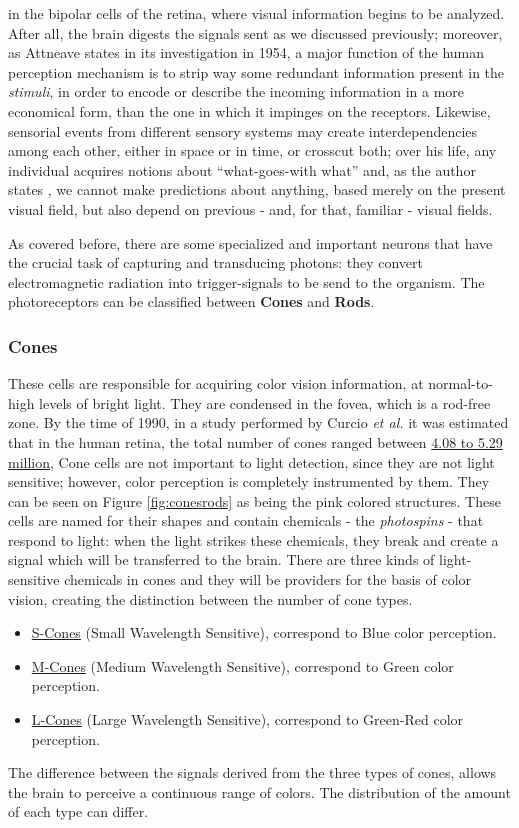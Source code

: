 \documentclass{report}
\begin{document}
in the bipolar cells of the retina, where visual information begins to be analyzed. After all, the brain digests the signals sent as we discussed
previously; moreover, as Attneave \cite{Attneave1954} states in its investigation in 1954, a major function of
the human perception mechanism is to strip way some redundant information present in the \emph{stimuli},
in order to encode or describe the incoming information in a more economical form, than the one in which
it impinges on the receptors. Likewise, sensorial events from different sensory systems may create
interdependencies among each other, either in space or in time, or crosscut both; over his life, any
individual acquires notions about “what-goes-with what” and, as the author states \cite{Attneave1954}, we cannot make
predictions about anything, based merely on the present visual field, but also depend on previous - and,
for that, familiar - visual fields. \par
As covered before, there are some specialized and important neurons
that have the crucial task of capturing and transducing photons: they convert electromagnetic radiation
into trigger-signals to be send to the organism.
The photoreceptors can be classified between \textbf{Cones} and \textbf{Rods}. \par
%
\subsubsection{Cones}
These cells are responsible for acquiring color vision information, at normal-to-high levels of bright
light. They are condensed in the fovea, which is a rod-free zone. By the time of 1990, in a study performed
by Curcio \emph{et al.} \cite{Curcio1990} it was estimated that in the human retina, the total number of cones ranged
between \underline{4.08 to 5.29 million}, Cone cells are not important to light detection, since they are not light
sensitive; however, color perception is completely instrumented by them. They can be seen on Figure \ref{fig:conesrods} as
being the pink colored structures.
These cells are named for their shapes and contain chemicals - the \emph{photospins} - that respond to light: when the
light strikes these chemicals, they break and create a signal which will be transferred to the brain.
There are three kinds of light-sensitive chemicals in cones and they will be providers for the basis
of color vision, creating the distinction between the number of cone types.
%
\begin{itemize}
\item \underline{S-Cones} (Small Wavelength Sensitive), correspond to Blue color perception.
\item \underline{M-Cones} (Medium Wavelength Sensitive), correspond to Green color perception.
\item \underline{L-Cones} (Large Wavelength Sensitive), correspond to Green-Red color perception.
\end{itemize} \par
%
The difference between the signals derived from the three types of cones, allows the brain to perceive a
continuous range of colors. The distribution of the amount of each type can differ.
\end{document}
